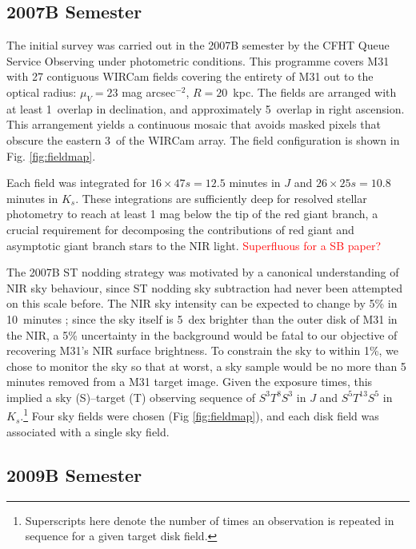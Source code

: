 \documentclass[iop]{emulateapj}
\newcommand{\changeit}[1]{\textcolor{red}{#1}} %
\begin{document}
\subsection{2007B Semester} %
\label{sec:obs7}

The initial survey was carried out in the 2007B semester by the CFHT Queue Service Observing under photometric conditions. This programme covers M31 with 27 contiguous WIRCam fields covering the entirety of M31 out to the optical radius: $\mu_V=23$ mag arcsec$^{-2}$, $R=20$~kpc. The fields are arranged with at least 1\arcmin\ overlap in declination, and approximately 5\arcmin\ overlap in right ascension.
This arrangement yields a continuous mosaic that avoids masked pixels that obscure the eastern 3\arcmin\ of the WIRCam array. The field configuration is shown in Fig. \ref{fig:fieldmap}.

Each field was integrated for $16\times 47 s = 12.5$ minutes in $J$ and $26\times 25 s = 10.8$ minutes in $K_s$. These integrations are sufficiently deep for resolved stellar photometry to reach at least 1 mag below the tip of the red giant branch, a crucial requirement for decomposing the contributions of red giant and asymptotic giant branch stars to the NIR light. \changeit{Superfluous for a SB paper?}

The 2007B ST nodding strategy was motivated by a canonical understanding of NIR sky behaviour, since ST nodding sky subtraction had never been attempted on this scale before. The NIR sky intensity can be expected to change by 5\% in 10~minutes \citep{Adams:1996,Vaduvescu:2004}; since the sky itself is 5~dex brighter than the outer disk of M31 in the NIR, a 5\% uncertainty in the background would be fatal to our objective of recovering M31's NIR surface brightness. To constrain the sky to within 1\%, we chose to monitor the sky so that at worst, a sky sample would be no more than 5 minutes removed from a M31 target image. Given the exposure times, this implied a sky (S)--target (T) observing sequence of $S^3T^8S^3$ in $J$ and $S^5T^{13}S^5$ in $K_s$.\footnote{Superscripts here denote the number of times an observation is repeated in sequence for a given target disk field.} Four sky fields were chosen (Fig \ref{fig:fieldmap}), and each disk field was associated with a single sky field.


\subsection{2009B Semester} %
\label{sub:obs9}
\end{document}
